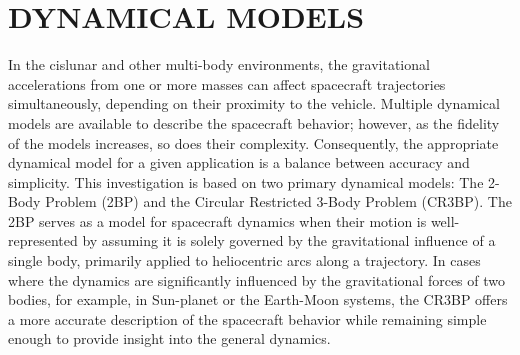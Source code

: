 \chapter{DYNAMICAL MODELS}

In the cislunar and other multi-body environments, the gravitational accelerations from one or more
masses can affect spacecraft trajectories simultaneously, depending on their proximity to the
vehicle. Multiple dynamical models are available to describe the spacecraft behavior; however, as
the fidelity of the models increases, so does their complexity. Consequently, the appropriate
dynamical model for a given application is a balance between accuracy and simplicity. This
investigation is based on two primary dynamical models: The 2-Body Problem (2BP) and the Circular
Restricted 3-Body Problem (CR3BP). The 2BP serves as a model for spacecraft dynamics when their
motion is well-represented by assuming it is solely governed by the gravitational influence of a
single body, primarily applied to heliocentric arcs along a trajectory. In cases where the dynamics
are significantly influenced by the gravitational forces of two bodies, for example, in Sun-planet
or the Earth-Moon systems, the CR3BP offers a more accurate description of the spacecraft behavior
while remaining simple enough to provide insight into the general dynamics.






